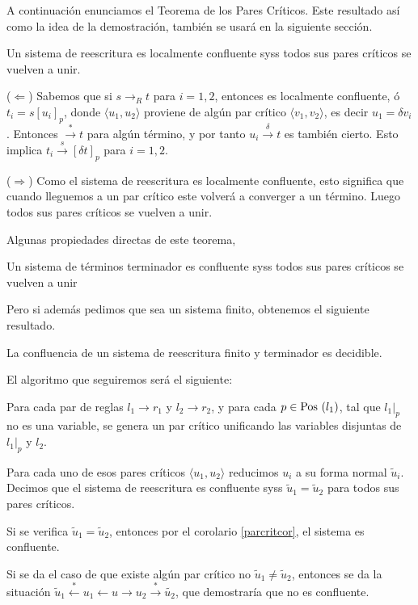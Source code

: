 
A continuación enunciamos el Teorema de los Pares Críticos. Este
resultado así como la idea de la demostración, también se usará en la
siguiente sección.
\begin{teor}
  Un sistema de reescritura es localmente confluente syss todos sus
  pares críticos se vuelven a unir.
\end{teor}

\begin{demo}
  ($\Leftarrow$) Sabemos que si $s \rightarrow_R t$ para $i = 1,2$,
  entonces es localmente confluente, ó $t_i = s[u_i]_p$, donde
  $\langle u_1, u_2 \rangle$ proviene de algún par crítico
  $\langle v_1, v_2 \rangle$, es decir $u_1 = \delta v_i$. Entonces
  $\xrightarrow{*}t$ para algún término, y por tanto
  $u_i \xrightarrow \delta t$ es también cierto. Esto implica
  $t_i \xrightarrow s[\delta t]_p$ para $i = 1,2$.

  ($\Rightarrow$) Como el sistema de reescritura es localmente
  confluente, esto significa que cuando lleguemos a un par crítico
  este volverá a converger a un término. Luego todos sus pares
  críticos se vuelven a unir.
\end{demo}

Algunas propiedades directas de este teorema,

\begin{coro}\label{parcritcor}
  Un sistema de términos terminador es confluente syss todos sus pares
  críticos se vuelven a unir
\end{coro}

Pero si además pedimos que sea un sistema finito, obtenemos el
siguiente resultado.

\begin{coro}
  La confluencia de un sistema de reescritura finito y terminador es
  decidible.
\end{coro}

\begin{demo}
  El algoritmo que seguiremos será el siguiente:

  Para cada par de reglas $l_1 \rightarrow r_1$ y
  $l_2 \rightarrow r_2$, y para cada $p \in \mbox{Pos }(l_1)$, tal que
  $l_1|_p$ no es una variable, se genera un par crítico unificando las
  variables disjuntas de $l_1|_p$ y $l_2$.

  Para cada uno de esos pares críticos $\langle u_1, u_2 \rangle$
  reducimos $u_i$ a su forma normal $\tilde{u}_i$. Decimos que el
  sistema de reescritura es confluente syss
  $\tilde{u}_1 = \tilde{u}_2$ para todos sus pares críticos.

  Si se verifica $\tilde{u}_1 = \tilde{u}_2$, entonces por el
  corolario \ref{parcritcor}, el sistema es confluente.

  Si se da el caso de que existe algún par crítico no
  $\tilde{u}_1 \not = \tilde{u}_2$, entonces se da la situación
  $\tilde{u}_1 \xleftarrow{*} u_1 \leftarrow u \rightarrow u_2
  \xrightarrow{*} \tilde{u_2}$, que demostraría que no es confluente.
\end{demo}

